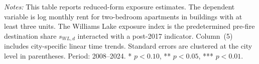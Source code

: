 \documentclass[12pt]{article}
\begin{document}
\begin{table}[!htbp]
  \centering
  \caption{Reduced-Form Rent Effects by Williams Lake Exposure}
  \label{tab:main_result}
  \small


  \par\smallskip
  \begin{minipage}{0.96\textwidth}
  \footnotesize
  \textit{Notes:} This table reports reduced-form exposure estimates. The dependent
  variable is log monthly rent for two-bedroom apartments in buildings with at
  least three units. The Williams Lake exposure index is the predetermined
  pre-fire destination share $s_{WL,d}$ interacted with a post-2017 indicator.
  Column~(5) includes city-specific linear time trends. Standard errors are
  clustered at the city level in parentheses. Period: 2008--2024.
  * $p<0.10$, ** $p<0.05$, *** $p<0.01$.
  \end{minipage}
\end{table}
\FloatBarrier
\end{document}
